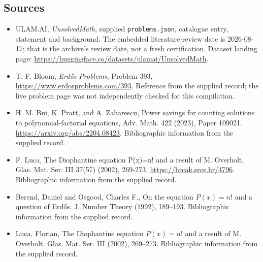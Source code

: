 \documentclass[11pt,a4paper]{article}
\begin{document}
\subsection{Sources}

{\small

\begin{itemize}

\item[\hypertarget{source:statement:1}{S1}] ULAM.AI, \emph{UnsolvedMath}, supplied \texttt{problems.json}, catalogue entry, statement and background. The embedded literature-review date is 2026-08-17; that is the archive’s review date, not a fresh certification. Dataset landing page: \url{https://huggingface.co/datasets/ulamai/UnsolvedMath}.

\item[\hypertarget{source:statement:2}{S2}] T. F. Bloom, \emph{Erdős Problems}, Problem 393, \url{https://www.erdosproblems.com/393}. Reference from the supplied record; the live problem page was not independently checked for this compilation.

\item[\hypertarget{source:statement:3}{S3}] H. M. Bui, K. Pratt, and A. Zaharescu, Power savings for counting solutions to polynomial-factorial equations, Adv. Math. 422 (2023), Paper 109021. \url{https://arxiv.org/abs/2204.08423}. Bibliographic information from the supplied record.

\item[\hypertarget{source:statement:4}{S4}] F. Luca, The Diophantine equation P(x)=n! and a result of M. Overholt, Glas. Mat. Ser. III 37(57) (2002), 269-273. \url{https://hrcak.srce.hr/4796}. Bibliographic information from the supplied record.

\item[\hypertarget{source:statement:5}{S5}] Berend, Daniel and Osgood, Charles F., On the equation {$P(x)=n!$} and a question of {E}rd\H{o}s. J. Number Theory (1992), 189--193. Bibliographic information from the supplied record.

\item[\hypertarget{source:statement:6}{S6}] Luca, Florian, The {D}iophantine equation {$P(x)=n!$} and a result of {M}. {O}verholt. Glas. Mat. Ser. III (2002), 269--273. Bibliographic information from the supplied record.

\end{itemize}

}

\label{end:statement}
\end{document}
